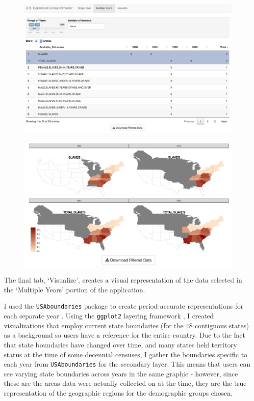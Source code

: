 \documentclass[DIV=calc, paper=a4, fontsize=10pt, twocolumn]{scrartcl}\usepackage[]{graphicx}\usepackage[]{color}
\begin{document}
\begin{figure}[hbtp]
\includegraphics[width=.48\textwidth]{./figures/search_slaves_40years.png}  
\label{shiny_1}
\end{figure}

\begin{figure}[hbtp]
\centering
\includegraphics[width=.48\textwidth]{./figures/visualize_slaves_40years_sum.png}  
\label{shiny_2}
\end{figure}

\par The final tab, `Visualize', creates a visual representation of the data selected in the `Multiple Years' portion of the application. 

\par I used the \texttt{USAboundaries} package to create period-accurate representations for each separate year \citep{USAboundaries}. Using the \texttt{ggplot2} layering framework \citep{ggplot2}, I created visualizations that employ current state boundaries (for the 48 contiguous states) as a background so users have a reference for the entire country. Due to the fact that state boundaries have changed over time, and many states held territory status at the time of some decennial censuses, I gather the boundaries specific to each year from \texttt{USAboundaries} for the secondary layer. This means that users can see varying state boundaries across years in the same graphic - however, since these are the areas data were actually collected on at the time, they are the true representation of the geographic regions for the demographic groups chosen. 
\end{document}
